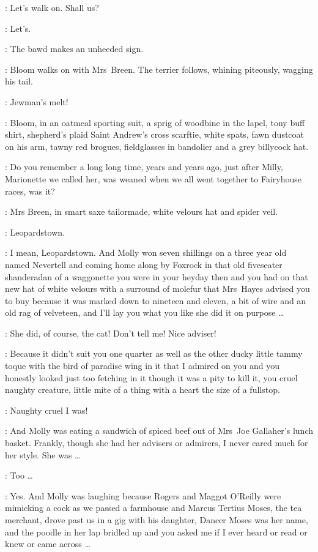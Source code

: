 \Bloom:
Let's walk on.
Shall us?

\MrsBreen:
Let's.

:
The bawd makes an unheeded sign.

:
Bloom walks on with Mrs~Breen.
The terrier follows, whining piteously, wagging his tail.

\Bawd[1]:
Jewman's melt!

:
Bloom, in an oatmeal sporting suit, a sprig of woodbine in the lapel,
tony buff shirt, shepherd's plaid Saint Andrew's cross scarftie,
white spats, fawn dustcoat on his arm, tawny red brogues,
fieldglasses in bandolier and a grey billycock hat.

\Bloom:
Do you remember a long long time,
years and years ago, just after Milly,
Marionette we called her,
was weaned when we all went together to Fairyhouse races, was it?

:
Mrs Breen, in smart saxe tailormade, white velours hat and spider veil.

\MrsBreen:
Leopardstown.

\Bloom:
I mean, Leopardstown.
And Molly won seven shillings on a three year old named Nevertell
and coming home along by Foxrock
in that old fiveseater shanderadan of a waggonette
you were in your heyday then and
you had on that new hat of white velours with a surround of molefur that Mrs~Hayes
advised you to buy because it was marked down to nineteen and eleven,
a bit of wire and an old rag of velveteen,
and I'll lay you what you like she did it on purpose \ldots

\MrsBreen:
She did, of course, the cat!
Don't tell me! Nice adviser!

\Bloom:
Because it didn't suit you one quarter as well as
the other ducky little tammy toque with the bird of paradise wing in it
that I admired on you and you honestly looked just too fetching in it
though it was a pity to kill it, you cruel naughty creature,
little mite of a thing with a heart the size of a
fullstop.%

\MrsBreen:
Naughty cruel I was!

\Bloom:
And Molly was eating a sandwich of spiced beef
out of Mrs~Joe Gallaher's lunch basket.
Frankly, though she had her advisers or admirers,
I never cared much for her style.
She was \ldots

\MrsBreen:
Too \ldots

\Bloom:
Yes.
And Molly was laughing because Rogers and Maggot O'Reilly
were mimicking a cock as we passed a farmhouse and
Marcus Tertius Moses, the tea merchant,
drove past us in a gig with his daughter,
Dancer Moses was her name,
and the poodle in her lap bridled up
and you asked me if I ever heard or read or knew or came across \ldots


